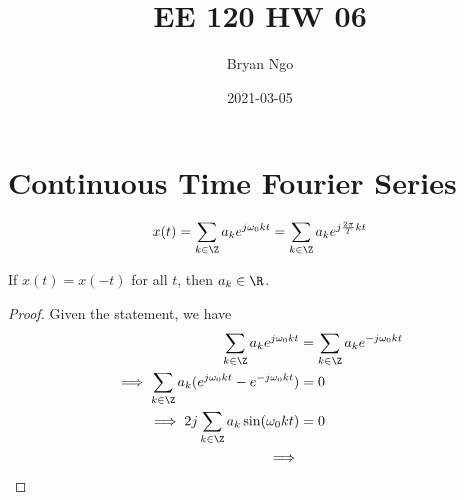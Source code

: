\documentclass{article}
\title{EE 120 HW 06}
\author{Bryan Ngo}
\date{2021-03-05}
\begin{document}
\maketitle

\section{Continuous Time Fourier Series}

\begin{equation}
    x(t) = \sum_{k \in \Z} a_k e^{j \omega_0 k t} = \sum_{k \in \Z} a_k e^{j \frac{2\pi}{T} kt}
\end{equation}

\begin{theorem}
    If \(x(t) = x(-t)\) for all \(t\), then \(a_k \in \R\).
\end{theorem}
\begin{proof}
    Given the statement, we have
    \begin{align}
        \sum_{k \in \Z} a_k e^{j \omega_0 k t} &= \sum_{k \in \Z} a_k e^{-j \omega_0 k t} \\
        \implies \sum_{k \in \Z} a_k (e^{j \omega_0 k t} - e^{-j \omega_0 k t}) &= 0 \\
        \implies 2j \sum_{k \in \Z} a_k \sin(\omega_0 k t) &= 0 \\
        \implies
    \end{align}
\end{proof}
\end{document}
